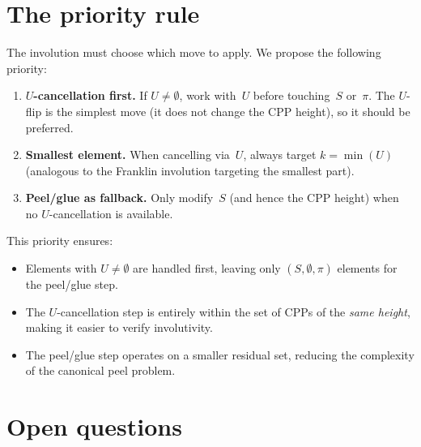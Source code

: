 \documentclass[11pt]{article}
\theoremstyle{plain}
\theoremstyle{definition}
\begin{document}
\section{The priority rule}
\label{sec:priority}

The involution must choose which move to apply.
We propose the following priority:

\begin{enumerate}
  \item \textbf{$U$-cancellation first.}
    If $U \neq \emptyset$, work with~$U$ before
    touching~$S$ or~$\pi$.  The $U$-flip is the simplest
    move (it does not change the CPP height), so it
    should be preferred.

  \item \textbf{Smallest element.}
    When cancelling via~$U$, always target
    $k = \min(U)$ (analogous to the Franklin
    involution targeting the smallest part).

  \item \textbf{Peel/glue as fallback.}
    Only modify~$S$ (and hence the CPP height) when
    no $U$-cancellation is available.
\end{enumerate}

This priority ensures:
\begin{itemize}
  \item Elements with $U \neq \emptyset$ are handled
    first, leaving only $(S, \emptyset, \pi)$ elements
    for the peel/glue step.
  \item The $U$-cancellation step is entirely within the
    set of CPPs of the \emph{same height}, making it
    easier to verify involutivity.
  \item The peel/glue step operates on a smaller residual
    set, reducing the complexity of the canonical peel
    problem.
\end{itemize}


\section{Open questions}
\end{document}
